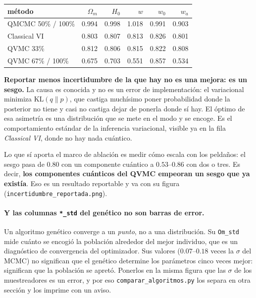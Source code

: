 \documentclass[11pt,a4paper]{article}
\begin{document}
\begin{center}
\small
\begin{tabular}{lrrrrr}
\toprule
método & $\Omega_m$ & $H_0$ & $w$ & $w_0$ & $w_a$ \\
\midrule
QMCMC 50\% / 100\% & 0.994 & 0.998 & 1.018 & 0.991 & 0.903 \\
Classical VI       & 0.803 & 0.807 & 0.813 & 0.826 & 0.801 \\
QVMC 33\%          & 0.812 & 0.806 & 0.815 & 0.822 & 0.808 \\
QVMC 67\% / 100\%  & 0.675 & 0.703 & 0.551 & 0.857 & 0.534 \\
\bottomrule
\end{tabular}
\end{center}

\noindent
\textbf{Reportar menos incertidumbre de la que hay no es una mejora: es un
sesgo.} La causa es conocida y no es un error de implementación: el
variacional minimiza $\mathrm{KL}(q \| p)$, que castiga muchísimo poner
probabilidad donde la posterior no tiene y casi no castiga dejar de ponerla
donde sí hay. El óptimo de esa asimetría es una distribución que se mete en el
modo y se encoge. Es el comportamiento estándar de la inferencia variacional,
visible ya en la fila \emph{Classical VI}, donde no hay nada cuántico.

Lo que sí aporta el marco de ablación es medir cómo escala con los peldaños:
el sesgo pasa de $0.80$ con un componente cuántico a $0.53$--$0.86$ con dos o
tres. Es decir, \textbf{los componentes cuánticos del QVMC empeoran un sesgo
que ya existía}. Eso es un resultado reportable y va con su figura
(\texttt{incertidumbre\_reportada.png}).

\paragraph{Y las columnas \texttt{*\_std} del genético no son barras de error.}
Un algoritmo genético converge a un \emph{punto}, no a una distribución. Su
\texttt{Om\_std} mide cuánto se encogió la población alrededor del mejor
individuo, que es un diagnóstico de convergencia del optimizador. Sus valores
($0.07$--$0.18$ veces la $\sigma$ del MCMC) no significan que el genético
determine los parámetros cinco veces mejor: significan que la población se
apretó. Ponerlos en la misma figura que las $\sigma$ de los muestreadores es
un error, y por eso \texttt{comparar\_algoritmos.py} los separa en otra sección
y los imprime con un aviso.

\end{document}
